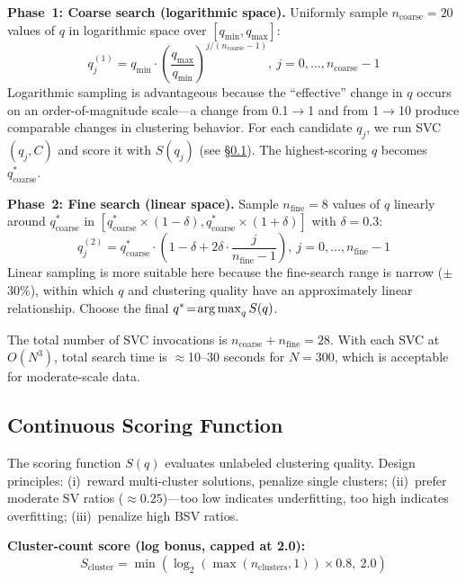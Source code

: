 \textbf{Phase~1: Coarse search (logarithmic space).} Uniformly sample $n_{\text{coarse}}\!=\!20$ values of $q$ in logarithmic space over $[q_{\min},q_{\max}]$:
\begin{equation}
q^{(1)}_j=q_{\min}\!\cdot\!\left(\frac{q_{\max}}{q_{\min}}\right)^{j/(n_{\text{coarse}}-1)},\ j=0,\dots,n_{\text{coarse}}\!-\!1
\end{equation}
Logarithmic sampling is advantageous because the ``effective'' change in $q$ occurs on an order-of-magnitude scale---a change from 0.1$\to$1 and from 1$\to$10 produce comparable changes in clustering behavior. For each candidate $q_j$, we run SVC$(q_j,C)$ and score it with $S(q_j)$ (see \S\ref{sec:scoring}). The highest-scoring $q$ becomes $q^*_{\text{coarse}}$.

\textbf{Phase~2: Fine search (linear space).} Sample $n_{\text{fine}}\!=\!8$ values of $q$ linearly around $q^*_{\text{coarse}}$ in $[q^*_{\text{coarse}}\!\times\!(1-\delta), q^*_{\text{coarse}}\!\times\!(1+\delta)]$ with $\delta\!=\!0.3$:
\begin{equation}
q^{(2)}_j=q^*_{\text{coarse}}\!\cdot\!(1-\delta+2\delta\cdot\textstyle\frac{j}{n_{\text{fine}}-1}),\ j=0,\dots,n_{\text{fine}}\!-\!1
\end{equation}
Linear sampling is more suitable here because the fine-search range is narrow ($\pm$30\%), within which $q$ and clustering quality have an approximately linear relationship. Choose the final $q^*\!=\!\operatorname*{arg\,max}_q S(q)$.

The total number of SVC invocations is $n_{\text{coarse}}\!+\!n_{\text{fine}}\!=\!28$. With each SVC at $O(N^3)$, total search time is $\approx$10--30 seconds for $N\!=\!300$, which is acceptable for moderate-scale data.

\subsection{Continuous Scoring Function}\label{sec:scoring}

The scoring function $S(q)$ evaluates unlabeled clustering quality. Design principles: (i)~reward multi-cluster solutions, penalize single clusters; (ii)~prefer moderate SV ratios (${\approx}0.25$)---too low indicates underfitting, too high indicates overfitting; (iii)~penalize high BSV ratios.

\textbf{Cluster-count score (log bonus, capped at 2.0):}
\begin{equation}
S_{\text{cluster}}=\min(\log_2(\max(n_{\text{clusters}},1))\times0.8,\ 2.0)
\end{equation}

